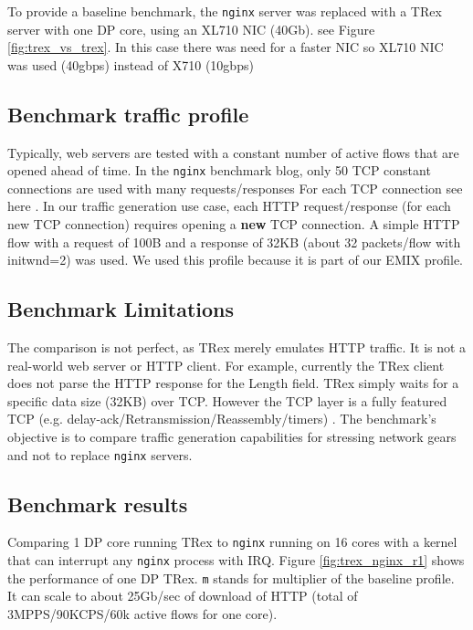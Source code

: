 \documentclass[letterpaper]{article}
\begin{document}
To provide a baseline benchmark, the \texttt{nginx} server was replaced with a TRex server with one DP core, using an XL710 NIC (40Gb). 
see Figure \ref{fig:trex_vs_trex}. In this case there was need for a faster NIC so XL710 NIC was used (40gbps) instead of X710 (10gbps)

\subsection{Benchmark traffic profile}

Typically, web servers are tested with a constant number of active flows that are opened ahead of time. 
In the \texttt{nginx} benchmark blog, only 50 TCP constant connections are used with many requests/responses 
For each TCP connection see here \cite{b6}. In our traffic generation use case, each HTTP request/response (for each new TCP connection) requires opening a \textbf{new} TCP connection. 
A simple HTTP flow with a request of 100B and a response of 32KB (about 32 packets/flow with initwnd=2) was used.
We used this profile because it is part of our EMIX profile. 

\subsection{Benchmark Limitations}

The comparison is not perfect, as TRex merely emulates HTTP traffic. 
It is not a real-world web server or HTTP client. For example, currently the TRex client does not parse the HTTP response for the Length field. 
TRex simply waits for a specific data size (32KB) over TCP. However the TCP layer is a fully featured TCP (e.g. delay-ack/Retransmission/Reassembly/timers) . 
The benchmark's objective is to compare traffic generation capabilities for stressing network gears and not to replace \texttt{nginx} servers. 

\subsection{Benchmark results}

Comparing 1 DP core running TRex to \texttt{nginx} running on 16 cores with a kernel that can interrupt any \texttt{nginx} process with IRQ. Figure \ref{fig:trex_nginx_r1} shows the performance of one DP TRex. \texttt{m} stands for multiplier of the baseline profile. 
It can scale to about 25Gb/sec of download of HTTP (total of 3MPPS/90KCPS/60k active flows for one core).
\end{document}
